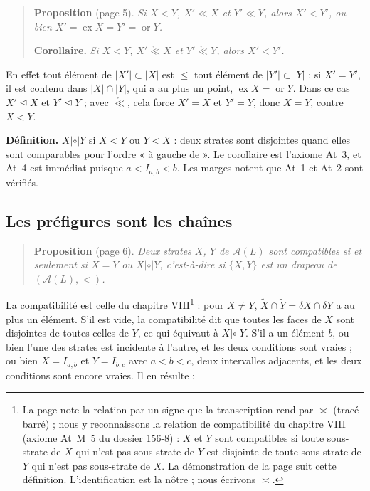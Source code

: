\documentclass[11pt,a4paper]{article}
\begin{document}
\begin{quote}
\textbf{Proposition} (page 5). \emph{Si $X < Y$, $X' \ll X$ et $Y' \ll Y$, alors
$X' < Y'$, ou bien $X' = \operatorname{ex} X = Y' = \operatorname{or} Y$.}

\textbf{Corollaire.} \emph{Si $X < Y$, $X' \mathrel{\mathring{\ll}} X$ et $Y'
\mathrel{\mathring{\ll}} Y$, alors $X' < Y'$.}
\end{quote}

En effet tout élément de $|X'| \subset |X|$ est $\leq$ tout élément de $|Y'|
\subset |Y|$ ; si $X' = Y'$, il est contenu dans $|X| \cap |Y|$, qui a au plus un
point, $\operatorname{ex} X = \operatorname{or} Y$. Dans ce cas $X'
\trianglelefteq X$ et $Y' \trianglelefteq Y$ ; avec $\mathrel{\mathring{\ll}}$,
cela force $X' = X$ et $Y' = Y$, donc $X = Y$, contre $X < Y$.

\textbf{Définition.} $X \mathrel{|\circ|} Y$ si $X < Y$ ou $Y < X$ : deux strates
sont disjointes quand elles sont comparables pour l'ordre « à gauche de ». Le
corollaire est l'axiome At~3, et At~4 est immédiat puisque $a < I_{a,b} < b$.
Les marges notent que At~1 et At~2 sont vérifiés.

\subsection*{Les préfigures sont les chaînes}

\begin{quote}
\textbf{Proposition} (page 6). \emph{Deux strates $X$, $Y$ de $\mathcal{A}(L)$
sont compatibles si et seulement si $X = Y$ ou $X \mathrel{|\circ|} Y$,
c'est-à-dire si $\{X, Y\}$ est un drapeau de $(\mathcal{A}(L), <)$.}
\end{quote}

La compatibilité est celle du chapitre VIII\footnote{La page note la relation
par un signe que la transcription rend par $\asymp$ (tracé barré) ; nous y
reconnaissons la relation de compatibilité du chapitre VIII (axiome At~M~5 du
dossier 156-8) : $X$ et $Y$ sont compatibles si toute sous-strate de $X$ qui
n'est pas sous-strate de $Y$ est disjointe de toute sous-strate de $Y$ qui n'est
pas sous-strate de $X$. La démonstration de la page suit cette
définition. L'identification est la nôtre ; nous écrivons $\asymp$.} :
pour $X \neq Y$, $\widetilde{X} \cap \widetilde{Y} = \delta X \cap \delta Y$ a
au plus un élément. S'il est vide, la compatibilité dit que toutes les faces de
$X$ sont disjointes de toutes celles de $Y$, ce qui équivaut à $X
\mathrel{|\circ|} Y$. S'il a un élément $b$, ou bien l'une des strates est
incidente à l'autre, et les deux conditions sont vraies ; ou bien $X = I_{a,b}$
et $Y = I_{b,c}$ avec $a < b < c$, deux intervalles adjacents, et les deux
conditions sont encore vraies. Il en résulte :
\end{document}
